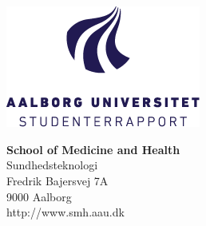 

{}
\thispagestyle{empty}

\begin{minipage}[t]{0.48\textwidth}
\vspace*{-25pt}			%
\includegraphics[height=4cm]{billeder/AAU-logo-stud-DK-RGB}
\end{minipage}
\hfill
\begin{minipage}[t]{0.48\textwidth}
{\small 
\textbf{School of Medicine and Health}  \\
Sundhedsteknologi \\
Fredrik Bajersvej 7A \\
9000 Aalborg \\
http://www.smh.aau.dk}
\end{minipage}

\vspace*{1cm}

